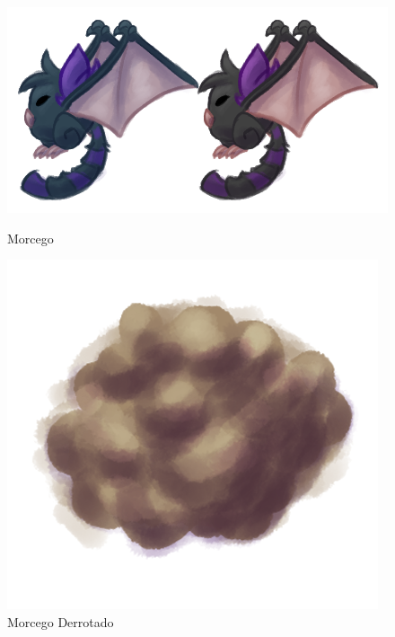 \documentclass[12pt]{article}
\begin{document}
\begin{figure}[!htb]
	\centering
	\begin{minipage}{0.5\textwidth}
		\centering
		\includegraphics[scale=0.15]{morcego.png}
		\caption{Morcego}
		\label{morcego}
	\end{minipage}%
	\begin{minipage}{0.5\textwidth}
		\centering
		\includegraphics[scale=0.17]{morcego_derrotado.png}
		\caption{Morcego Derrotado}
		\label{morcego_derrotado}
	\end{minipage}
\end{figure}

\newpage
\end{document}
